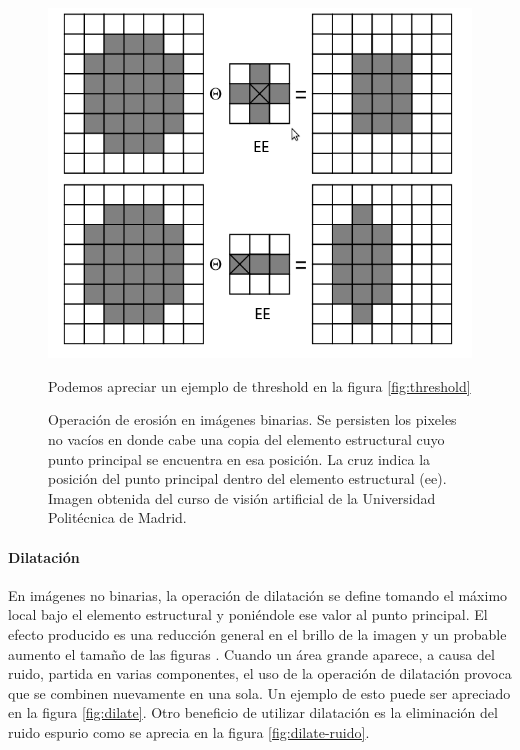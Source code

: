 \begin{figure}[tpb]
\begin{center}
  \includegraphics[scale=0.4]{figuras/erode-sample.png}
\end{center}Podemos apreciar un ejemplo de threshold en la figura \ref{fig:threshold}
  \caption{\small Operación de erosión en imágenes binarias. Se persisten los pixeles no vacíos en donde cabe una copia del elemento estructural cuyo punto principal se encuentra en esa posición. La cruz indica la posición del punto principal dentro del elemento estructural (ee). Imagen obtenida del curso de visión artificial de la Universidad Politécnica de Madrid. } 
  \label{fig:erode-sample}
\end{figure}

	\paragraph{Dilatación}
En imágenes no binarias, la operación de dilatación se define tomando el máximo local bajo el elemento estructural y poniéndole ese valor al punto principal. El efecto producido es una reducción general en el brillo de la imagen y un probable aumento el tamaño de las figuras \cite{nasa-dilate-erode}.  Cuando un área grande aparece, a causa del ruido, partida en varias componentes, el uso de la operación de dilatación provoca que  se combinen nuevamente en una sola. Un ejemplo de esto puede ser apreciado en la figura \ref{fig:dilate}. Otro beneficio de utilizar dilatación es la eliminación del ruido espurio como se aprecia en la figura \ref{fig:dilate-ruido}.

